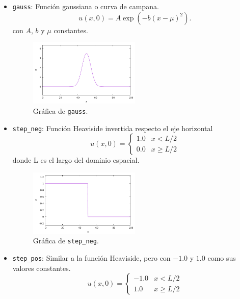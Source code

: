\documentclass[12pt]{article}
\begin{document}
	\begin{itemize}
		\item \texttt{gauss}: Función gaussiana o curva de campana.
		\begin{equation}
			u(x,0) = A\exp(-b(x-\mu)^{2}).
		\end{equation}
		con $A$, $b$ y $\mu$ constantes.
		\begin{figure}[ht]
			\centering
			\includegraphics[width=0.5\textwidth]{../burgers1DVF/results/graficas_iniciales/gauss.pdf}
			\caption*{Gráfica de \texttt{gauss}.}
		\end{figure}
		\item \texttt{step\_neg}: Función Heaviside invertida respecto el eje horizontal
		\begin{equation}
			u(x,0) = 
			\begin{cases}
				1.0 & x < L/2\\
				0.0 & x \geq L/2
			\end{cases}
		\end{equation}
		donde L es el largo del dominio espacial.
		\begin{figure}[ht]
			\centering
			\includegraphics[width=0.5\textwidth]{../burgers1DVF/results/graficas_iniciales/step_neg.pdf}
			\caption*{Gráfica de \texttt{step\_neg}.}
		\end{figure}
		\item \texttt{step\_pos}: Similar a la función Heaviside, pero con $-1.0$ y $1.0$ como sus valores constantes.
		\begin{equation}
			u(x,0) = 
			\begin{cases}
				-1.0 & x < L/2\\
				1.0 & x \geq L/2
			\end{cases}

\end{equation}
\end{itemize}
\end{document}
